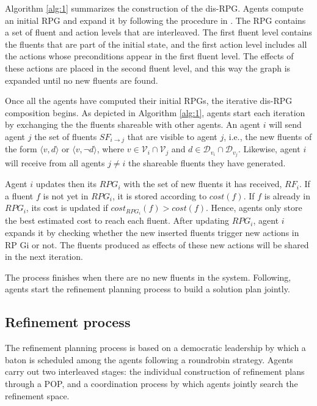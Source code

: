 \documentclass[12pt]{article}
\begin{document}
Algorithm \ref{alg:1} summarizes the construction of the dis-RPG.
Agents compute an initial RPG and expand it by following the procedure in \cite{Hoffmann2011TheFP}.
The RPG contains a set of fluent and action levels that are interleaved.
The first fluent level contains the fluents that are part of the initial state, and the first action level includes all the actions whose preconditions appear in the first fluent level.
The effects of these actions are placed in the second fluent level, and this way the graph is expanded until no new fluents are found.

Once all the agents have computed their initial RPGs, the iterative dis-RPG composition begins.
As depicted in Algorithm \ref{alg:1}, agents start each iteration by exchanging the the fluents shareable with other agents.
An agent $i$ will send agent $j$ the set of fluents $SF_{i\rightarrow j}$ that are visible to agent $j$, i.e., the new fluents of the form $\langle v,d\rangle$ or $\langle v,\neg d\rangle$, where $v \in \mathcal{V}_i \cap \mathcal{V}_j$ and $d \in \mathcal{D}_{v_i} \cap \mathcal{D}_{v_j}$.
Likewise, agent $i$ will receive from all agents $j \neq i$ the shareable fluents they have generated.

Agent $i$ updates then its $RPG_i$ with the set of new fluents it has received, $RF_i$.
If a fluent $f$ is not yet in $RPG_i$, it is stored according to $cost(f)$.
If $f$ is already in $RPG_i$, its cost is updated if $cost_{RPG_i}(f) > cost(f)$.
Hence, agents only store the best estimated cost to reach each fluent.
After updating $RPG_i$, agent $i$ expands it by checking whether the new inserted fluents trigger new actions in RP Gi or not.
The fluents produced as effects of these new actions will be shared in the next iteration.

The process finishes when there are no new fluents in the system.
Following, agents start the refinement planning process to build a solution plan jointly.

\subsection{Refinement process}

The refinement planning process is based on a democratic leadership by which a baton is scheduled among the agents following a roundrobin strategy.
Agents carry out two interleaved stages: the individual construction of refinement plans through a POP, and a coordination process by which agents jointly search the refinement space.
\end{document}
